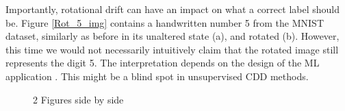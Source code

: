 \documentclass[a4paper]{article}
\begin{document}
Importantly, rotational drift can have an impact on what a correct label should be. Figure \ref{Rot_5_img} contains a handwritten number 5 from the MNIST dataset, similarly as before in its unaltered state (a), and rotated (b). However, this time we would not necessarily intuitively claim that the rotated image still represents the digit 5. The interpretation depends on the design of the ML application \cite{shorten_survey_2019}. This might be a blind spot in unsupervised CDD methods.

\begin{figure}%
    \centering
    \qquad
    \caption{2 Figures side by side}%
    \label{Rot_img}%
\end{figure} 
\end{document}
